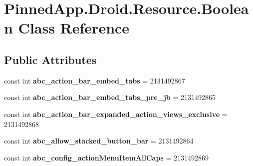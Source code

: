 \hypertarget{class_pinned_app_1_1_droid_1_1_resource_1_1_boolean}{}\section{Pinned\+App.\+Droid.\+Resource.\+Boolean Class Reference}
\label{class_pinned_app_1_1_droid_1_1_resource_1_1_boolean}
\subsection*{Public Attributes}
\begin{DoxyCompactItemize}
\item 
\mbox{\label{class_pinned_app_1_1_droid_1_1_resource_1_1_boolean_a3a87318e5e4d25a1758642d8154aee32}} 
const int {\bfseries abc\+\_\+action\+\_\+bar\+\_\+embed\+\_\+tabs} = 2131492867
\item 
\mbox{\label{class_pinned_app_1_1_droid_1_1_resource_1_1_boolean_a3d379556b73389f18a57d3ac2da27fcc}} 
const int {\bfseries abc\+\_\+action\+\_\+bar\+\_\+embed\+\_\+tabs\+\_\+pre\+\_\+jb} = 2131492865
\item 
\mbox{\label{class_pinned_app_1_1_droid_1_1_resource_1_1_boolean_abd2ee2a0a0be62692a8eec89b1eb3ed6}} 
const int {\bfseries abc\+\_\+action\+\_\+bar\+\_\+expanded\+\_\+action\+\_\+views\+\_\+exclusive} = 2131492868
\item 
\mbox{\label{class_pinned_app_1_1_droid_1_1_resource_1_1_boolean_aa2243c058a4006afc1d22aa5aed9b7a2}} 
const int {\bfseries abc\+\_\+allow\+\_\+stacked\+\_\+button\+\_\+bar} = 2131492864
\item 
\mbox{\label{class_pinned_app_1_1_droid_1_1_resource_1_1_boolean_ad4354d574390528c91c2a924fe4dfbe9}} 
const int {\bfseries abc\+\_\+config\+\_\+action\+Menu\+Item\+All\+Caps} = 2131492869
\item 
\mbox{\label{class_pinned_app_1_1_droid_1_1_resource_1_1_boolean_ab01b95446fa4f909fbd805c7f223cf7c}} 

\end{DoxyCompactItemize}
